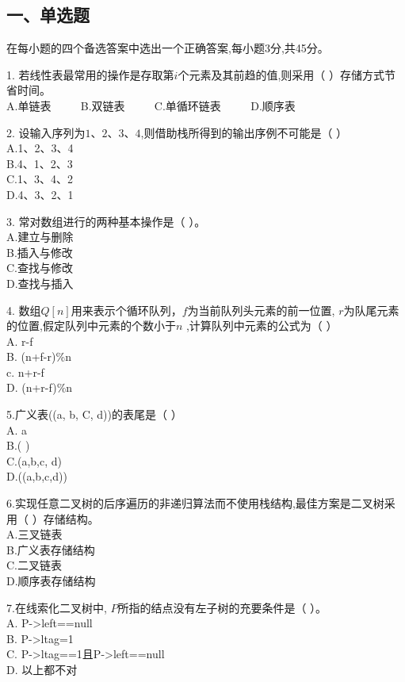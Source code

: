 
\subsection{一、单选题}
在每小题的四个备选答案中选出一个正确答案,每小题3分,共45分。

1. 若线性表最常用的操作是存取第$i$个元素及其前趋的值,则采用（  ）存储方式节省时间。 \\
A.单链表 $\qquad$ B.双链表 $\qquad$ C.单循环链表 $\qquad$ D.顺序表

2. 设输入序列为$1$、$2$、$3$、$4$,则借助栈所得到的输出序例不可能是（  ） \\
A.1、2、3、4 \\
B.4、1、2、3 \\
C.1、3、4、2 \\
D.4、3、2、1

3. 常对数组进行的两种基本操作是（  ）。 \\
A.建立与删除 \\
B.插入与修改 \\
C.查找与修改 \\
D.查找与插入

4. 数组$Q[n]$用来表示个循环队列，$f$为当前队列头元素的前一位置, $r$为队尾元素的位置,假定队列中元素的个数小于$n$ ,计算队列中元素的公式为（  ） \\
A. r-f \\
B. (n+f-r)\%n \\
c. n+r-f \\
D. (n+r-f)\%n

5.广义表((a, b, C, d))的表尾是（  ） \\
A. a \\
B.( ) \\
C.(a,b,c, d) \\
D.((a,b,c,d))

6.实现任意二叉树的后序遍历的非递归算法而不使用栈结构,最佳方案是二叉树采用（    ）存储结构。 \\
A.三叉链表 \\
B.广义表存储结构 \\
C.二叉链表 \\
D.顺序表存储结构

7.在线索化二叉树中, $P$所指的结点没有左子树的充要条件是（    ）。 \\
A. P->left==null \\
B. P->ltag=1 \\
C. P->ltag==1且P->left==null \\
D. 以上都不对

